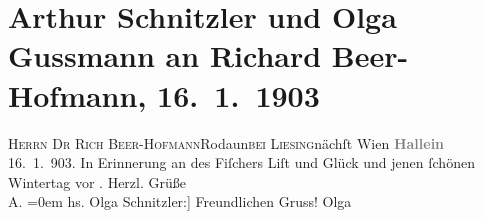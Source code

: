 

         
         \renewcommand{\erwaehntePersonen}{Personen: Richard Beer-Hofmann, Samuel Fischer, Olga Schnitzler}
         \renewcommand{\erwaehnteOrte}{Orte: Hallein, Rodaun, Wien, XXIII., Liesing}
         \renewcommand{\erwaehnteWerke}{}
               \section[Arthur Schnitzler und Olga Gussmann an Richard Beer-Hofmann, 16. 1. 1903]{ Arthur Schnitzler und Olga Gussmann an Richard Beer-Hofmann,
               16. 1. 1903}\nopagebreak{}\rehead{ }\begin{ledgroupsized}[t]{13cm}\normalsize\beginnumbering \toendnotes[C]{\smallbreak\pagebreak[2]} 
\toendnotes[C]{\smallbreak}\pstart{}{\pb}\textsc{Herrn Dr Rich Beer-Hofmann}\pend{}\pstart{}Rodaun\pend{}\pstart{}\textsc{bei Liesing}\pend{}\pstart{}nächſt Wien\pend{}{\bigskip}\pstart
           \noindent{}\centering{}{\pb}\textcolor{gray}{\textbf{Hallein}}\pend
           \pstart
           \raggedleft{}16. 1. 903.\pend
           \pstart
           In Erinnerung an des Fiſchers Liſt und Glück
               und jenen ſchönen Wintertag vor \label{K_L01266-1v}\label{K_L01266-1h}.\pend
           \pstart
           Herzl. Grüße{\\[\baselineskip]}\spacefill\mbox{A.}\pend
           \leftskip=0em{}\pstart
           \noindent{}{[}hs. Olga Schnitzler:{]} Freundlichen Gruss! \spacefill\mbox{Olga}\pend
           
         
         \endnumbering{}\end{ledgroupsized}  \newcommand{\dateiname}{L01266}\newcommand{\titel}{Arthur Schnitzler und Olga Gussmann an Richard Beer-Hofmann, 16. 1. 1903}\newcommand{\editorInnen}{Martin Anton Müller und Gerd-Hermann Susen}
      